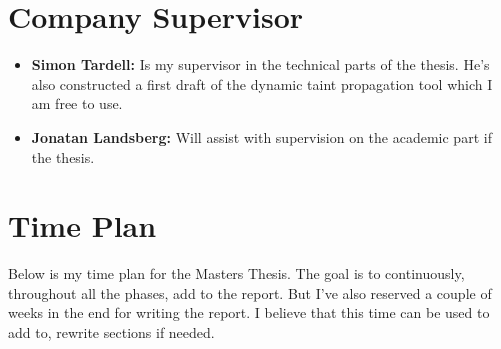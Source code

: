 \documentclass{../kththesis}
\begin{document}
\section{Company Supervisor}
\begin{itemize}
	\item \textbf{Simon Tardell:} Is my supervisor in the technical parts of the thesis. He's also constructed a first draft of the dynamic taint propagation tool which I am free to use.
	\item \textbf{Jonatan Landsberg:} Will assist with supervision on the academic part if the thesis.
\end{itemize}


\section{Time Plan}
Below is my time plan for the Masters Thesis. The goal is to continuously, throughout all the phases, add to the report. But I've also reserved a couple of weeks in the end for writing the report. I believe that this time can be used to add to, rewrite sections if needed.  \\ \\

\begin{ganttchart}[vgrid, hgrid, today=3]{1}{20}
	 \\
	\\
	 \\
	 \\
	 \\
	 \\
	 \\
\end{ganttchart}

\printbibliography[heading=bibintoc] %
\end{document}

